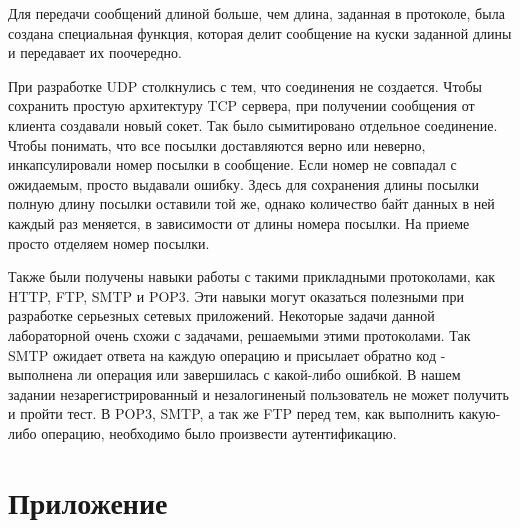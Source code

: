 Для передачи сообщений длиной больше, чем длина, заданная в протоколе, была создана специальная функция, которая делит сообщение на куски заданной длины и передавает их поочередно.

При разработке UDP столкнулись с тем, что соединения не создается. Чтобы сохранить простую архитектуру TCP сервера, при получении сообщения от клиента создавали новый сокет. Так было сымитировано отдельное соединение. Чтобы понимать, что все посылки доставляются верно или неверно, инкапсулировали номер посылки в сообщение. Если номер не совпадал с ожидаемым, просто выдавали ошибку. Здесь для сохранения длины посылки полную длину посылки оставили той же, однако количество байт данных в ней каждый раз меняется, в зависимости от длины номера посылки. На приеме просто отделяем номер посылки.

Также были получены навыки работы с такими прикладными протоколами, как HTTP, FTP, SMTP и POP3. Эти навыки могут оказаться полезными при разработке серьезных сетевых приложений.
Некоторые задачи данной лабораторной очень схожи с задачами, решаемыми этими протоколами. Так SMTP ожидает ответа на каждую операцию и присылает обратно код - выполнена ли операция или завершилась с какой-либо ошибкой. В нашем задании незарегистрированный и незалогиненый пользователь не может получить и пройти тест. В POP3, SMTP, а так же FTP перед тем, как выполнить какую-либо операцию, необходимо было произвести аутентификацию.

\section{Приложение}



\parindent=1cm


\parindent=1cm


\parindent=1cm


\parindent=1cm



\parindent=1cm


